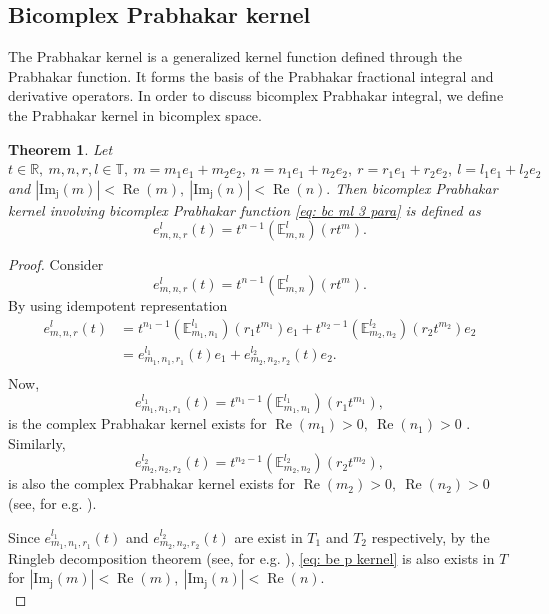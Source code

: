 \documentclass[a4paper,12pt]{article}
\newtheorem{theorem}{Theorem}[section]
\theoremstyle{remark}
\begin{document}
\subsection{Bicomplex Prabhakar kernel}
The Prabhakar kernel is a generalized kernel function defined through the Prabhakar function. It forms the basis of the Prabhakar fractional integral and derivative operators.
In order to discuss bicomplex Prabhakar integral, we define 
the Prabhakar kernel in bicomplex space. 
\begin{theorem}
		Let   $t\in \mathbb{R},~m,n,r,l \in \mathbb{T},~m= m_1e_1+m_2e_2,  ~ n=n_1e_1+n_2e_2,~ r=r_1e_1+r_2e_2,~l=l_1e_1+l_2e_2$ and $|\operatorname{Im_j}(m)|<\operatorname{Re}(m),~|\operatorname{Im_j}(n)|<\operatorname{Re}(n).$ Then   bicomplex Prabhakar kernel involving bicomplex Prabhakar function \eqref{eq: bc ml 3 para} is defined as 
	\begin{equation}\label{eq: be p kernel}
	e_{m,n,r}^{l}(t)=t^{n-1}(\mathbb{E}_{m,n}^l)(r t^{m}).
	\end{equation}
	
\end{theorem}
\begin{proof}
	
Consider
	\begin{equation}
e_{m,n,r}^{l}(t)=t^{n-1}(\mathbb{E}_{m,n}^l)(r t^{m}).
\end{equation}
By using idempotent representation
\begin{equation}
\begin{split}
e_{m,n,r}^{l}(t)
&=t^{n_1-1}(\mathbb{E}_{m_1,n_1}^{l_1})(r_1 t^{m_1}) e_1+t^{n_2-1}(\mathbb{E}_{m_2,n_2}^{l_2})(r_2 t^{m_2})e_2\\
&=e_{m_1,n_1,r_1}^{l_1}(t)e_1+e_{m_2,n_2,r_2}^{l_2}(t)e_2.\\
\end{split}
\end{equation}
Now,
\begin{equation}\label{eq:newfun1}
e_{m_1,n_1,r_1}^{l_1}(t)=t^{n_1-1}(\mathbb{E}_{m_1,n_1}^{l_1})(r_1 t^{m_1}),
\end{equation}
is the  complex Prabhakar kernel  exists for $\operatorname{Re}(m_1)>0,~\operatorname{Re}(n_1)>0$ \cite{polito2016some,garra2014hilfer}.  \\

 
\noindent Similarly,
\begin{equation}\label{eq:newfun2}
e_{m_2,n_2,r_2}^{l_2}(t)=t^{n_2-1}(\mathbb{E}_{m_2,n_2}^{l_2})(r_2 t^{m_2}),
\end{equation}
is also  the  complex Prabhakar kernel  exists for $\operatorname{Re}(m_2)>0,~\operatorname{Re}(n_2)>0$ (see, for e.g. \cite{polito2016some,garra2014hilfer}).

	Since $e_{m_1,n_1,r_1}^{l_1}(t)$ and $e_{m_2,n_2,r_2}^{l_2}(t)$ are exist in $T_1$ and $ T_2$ respectively, by the Ringleb
decomposition theorem  (see, for e.g. \cite{ringlab1933}),  \eqref{eq: be p kernel} is also exists in $T$ for  $|\operatorname{Im_j}(m)|<\operatorname{Re}(m),~|\operatorname{Im_j}(n)|<\operatorname{Re}(n).$\\
\end{proof}
\end{document}
